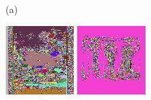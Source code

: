\documentclass{article}
\begin{document}
\begin{figure}[t]
  \centering
  \begin{minipage}[c]{.1\linewidth}
    \centering\centerline{(a)}
  \end{minipage}
  \begin{minipage}[c]{.21\linewidth}
    \centering\centerline{\includegraphics[width=\linewidth]{imgs/gens_cal/airplane/products/13.png}}
  \end{minipage}
  \begin{minipage}[c]{.21\linewidth}
    \centering\centerline{\includegraphics[width=\linewidth]{imgs/gens_cal/dollar/products/0.png}}

\end{minipage}
\end{figure}
\end{document}
